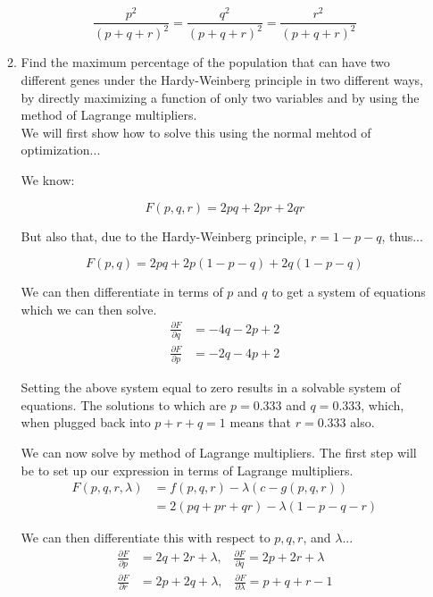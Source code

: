 \documentclass[11pt]{article}
\begin{document}
\begin{enumerate}
\begin{enumerate}
    \[\frac{p^2}{(p+q+r)^2} = \frac{q^2}{(p+q+r)^2}  = \frac{r^2}{(p+q+r)^2} \]
    
    \item Find the maximum percentage of the population that can have two different genes
    under the Hardy-Weinberg principle in two different ways, by directly maximizing a
    function of only two variables and by using the method of Lagrange
    multipliers. \\

    We will first show how to solve this using the normal mehtod of
    optimization...

    We know:

    \[F(p,q,r) = 2pq + 2pr + 2qr\]

    But also that, due to the Hardy-Weinberg principle, $r = 1 - p - q$,
    thus...

    \[F(p,q) = 2pq + 2p(1-p-q) + 2q(1-p-q)\]

    We can then differentiate in terms of $p$ and $q$ to get a system of
    equations which we can then solve.
    \begin{align*}
        \frac{\partial F}{\partial q} &= -4q - 2p + 2 \\
        \frac{\partial F}{\partial p} &= -2q - 4p + 2
    \end{align*}


    Setting the above system equal to zero results in a solvable system of
    equations. The solutions to which are $p=0.333$ and $q=0.333$, which, when
    plugged back into $p + r + q = 1$ means that $r=0.333$ also.

    We can now solve by method of Lagrange multipliers. The first step will be
    to set up our expression in terms of Lagrange multipliers.
    \begin{align*}
        F(p,q,r,\lambda) &= f(p,q,r) - \lambda(c-g(p,q,r)) \\
                   &= 2(pq + pr + qr) - \lambda(1-p-q-r)
    \end{align*}

    We can then differentiate this with respect to $p, q, r$, and $\lambda$...
    \begin{align*}
        \frac{\partial F}{\partial p} &= 2q + 2r + \lambda,\;\;\;  
        \frac{\partial F}{\partial q} = 2p + 2r + \lambda \\ 
        \frac{\partial F}{\partial r} &= 2p + 2q + \lambda, \;\;\;
        \frac{\partial F}{\partial \lambda} = p + q + r - 1
    \end{align*}


\end{enumerate}
\end{enumerate}
\end{document}
